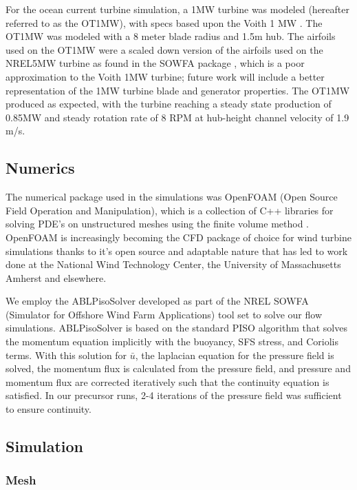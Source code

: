 For the ocean current turbine simulation, a 1MW turbine was modeled (hereafter referred to as the OT1MW), with specs based upon the Voith 1 MW \cite{Voith}. The OT1MW was modeled with a 8 meter blade radius and 1.5m hub. The airfoils used on the OT1MW were a scaled down version of the airfoils used on the NREL5MW turbine as found in the SOWFA package \cite{SOWFA}, which is a poor approximation to the Voith 1MW turbine; future work will include a better representation of the 1MW turbine blade and generator properties. The OT1MW produced as expected, with the turbine reaching a steady state production of 0.85MW and steady rotation rate of 8 RPM at hub-height channel velocity of 1.9 m/s.



\subsection{Numerics}


The numerical package used in the simulations was OpenFOAM (Open Source Field Operation and Manipulation), which is a collection of C++ libraries for solving PDE's on unstructured meshes using the finite volume method \cite{OpenFOAM}. OpenFOAM is increasingly becoming the CFD package of choice for wind turbine simulations thanks to it's open source and adaptable nature that has led to work done at the National Wind Technology Center, the University of Massachusetts Amherst and elsewhere.

We employ the ABLPisoSolver developed as part of the NREL SOWFA (Simulator for Offshore Wind Farm Applications) tool set \cite{SOWFA} to solve our flow simulations.  ABLPisoSolver is based on the standard PISO algorithm that solves the momentum equation implicitly with the buoyancy, SFS stress, and Coriolis terms. With this solution for $\bar{u}$, the laplacian equation for the pressure field is solved, the momentum flux is calculated from the pressure field, and pressure and momentum flux are corrected iteratively such that the continuity equation is satisfied. In our precursor runs, 2-4 iterations of the pressure field was sufficient to ensure continuity.

\subsection{Simulation}


\subsubsection{Mesh}

